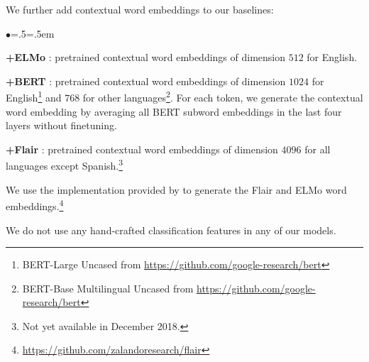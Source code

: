 \documentclass[11pt,a4paper]{article}
\newenvironment{citemize}{\begin{list}{$\bullet$}{\topsep=.5\smallskipamount\itemsep=0pt\parsep=1pt\labelwidth=.5em}}{\end{list}}
\begin{document}
We further add contextual word embeddings to our baselines:

\begin{citemize}
  \item \textbf{+ELMo} \cite{Peters2018}: pretrained contextual word embeddings
    of dimension $512$ for English.
  \item \textbf{+BERT} \cite{BERT}: pretrained contextual word embeddings of dimension
    $1024$ for English\footnote{BERT-Large Uncased from \url{https://github.com/google-research/bert}} and $768$ for other languages\footnote{BERT-Base Multilingual Uncased from \url{https://github.com/google-research/bert}}. For each token, we generate the contextual word embedding
    by averaging all BERT subword embeddings in the last four layers \cite{BERT} without finetuning.
  \item \textbf{+Flair} \cite{Akbik}: pretrained contextual word embeddings of dimension
    $4096$ for all languages except Spanish.\footnote{Not yet available in December
    2018.}
\end{citemize}

We use the implementation provided by \citet{Akbik} to generate the Flair and
ELMo word embeddings.\footnote{\url{https://github.com/zalandoresearch/flair}}

We do not use any hand-crafted classification features in any of our models.
\end{document}
